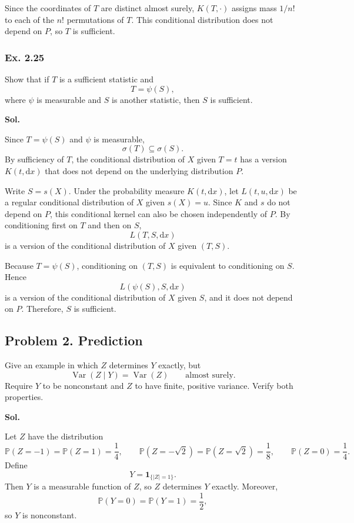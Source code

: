 \documentclass[lang=en,11pt,a4paper,citestyle=authoryear]{elegantpaper}
\renewcommand{\P}{\mathbb{P}}
\begin{document}
Since the coordinates of $T$ are distinct almost surely,
$K(T,\cdot)$ assigns mass $1/n!$ to each of the $n!$
permutations of $T$. This conditional distribution does not
depend on $P$, so $T$ is sufficient.

\subsubsection*{Ex. 2.25}
Show that if $T$ is a sufficient statistic and
\[
T=\psi(S),
\]
where $\psi$ is measurable and $S$ is another statistic, then $S$ is
sufficient.\par
\vspace{0.5em}
\textbf{Sol.}\par
Since $T=\psi(S)$ and $\psi$ is measurable,
\[
\sigma(T)\subseteq\sigma(S).
\]
By sufficiency of $T$, the conditional distribution of $X$ given
$T=t$ has a version $K(t,\mathrm{d}x)$ that does not depend on
the underlying distribution $P$.

Write $S=s(X)$. Under the probability measure
$K(t,\mathrm{d}x)$, let $L(t,u,\mathrm{d}x)$ be a regular
conditional distribution of $X$ given $s(X)=u$.
Since $K$ and $s$ do not depend on $P$, this conditional kernel
can also be chosen independently of $P$.
By conditioning first on $T$ and then on $S$,
\[
L(T,S,\mathrm{d}x)
\]
is a version of the conditional distribution of $X$ given
$(T,S)$.

Because $T=\psi(S)$, conditioning on $(T,S)$ is equivalent
to conditioning on $S$. Hence
\[
L(\psi(S),S,\mathrm{d}x)
\]
is a version of the conditional distribution of $X$ given $S$,
and it does not depend on $P$. Therefore, $S$ is sufficient.



\subsection*{Problem 2. Prediction}
Give an example in which $Z$ determines $Y$ exactly, but
\[
\operatorname{Var}(Z\mid Y)=\operatorname{Var}(Z)
\qquad\text{almost surely}.
\]
Require $Y$ to be nonconstant and $Z$ to have finite, positive variance.
Verify both properties.\par
\vspace{1em}
\textbf{Sol.}\par
Let $Z$ have the distribution
\[
\P(Z=-1)=\P(Z=1)=\frac14,\qquad
\P(Z=-\sqrt{2})=\P(Z=\sqrt{2})=\frac18,\qquad
\P(Z=0)=\frac14.
\]
Define
\[
Y=\mathbf{1}_{\{|Z|=1\}}.
\]
Then $Y$ is a measurable function of $Z$, so $Z$ determines $Y$
exactly. Moreover,
\[
\P(Y=0)=\P(Y=1)=\frac12,
\]
so $Y$ is nonconstant.
\end{document}
